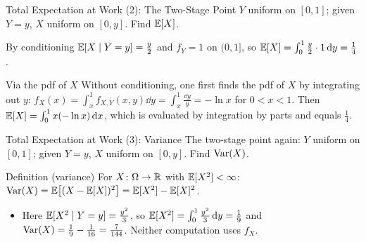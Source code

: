 \begin{frame}{Total Expectation at Work (2): The Two-Stage Point}
  \small
  $Y$ uniform on $[0,1]$; given $Y=y$, $X$ uniform on $[0,y]$. Find $\mathbb{E}[X]$.
  \begin{block}{By conditioning}
    $\mathbb{E}[X\mid Y=y]=\tfrac y2$ and $f_Y=1$ on $(0,1]$, so
    $\mathbb{E}[X]=\int_0^1\tfrac y2\cdot1\,\mathrm{d} y=\tfrac14$.
  \end{block}
  \begin{block}{Via the pdf of $X$}
    Without conditioning, one first finds the pdf of $X$ by integrating out $y$: $f_X(x)=\int_x^1 f_{X,Y}(x,y)\dd y=\int_x^1\tfrac{\dd y}{y}=-\ln x$ for $0<x<1$.
    Then $\mathbb{E}[X]=\int_0^1 x(-\ln x)\,\mathrm{d} x$, which is evaluated by integration by parts and equals $\tfrac14$.
  \end{block}
\end{frame}

\begin{frame}{Total Expectation at Work (3): Variance}
  \small
  \label{variance}%
  The two-stage point again: $Y$ uniform on $[0,1]$; given $Y=y$, $X$ uniform on $[0,y]$. Find $\operatorname{Var}(X)$.
  \begin{block}{Definition (variance)}
    For $X\colon\Omega\to\mathbb{R}$ with $\mathbb{E}[X^2]<\infty$: \quad $\operatorname{Var}(X)=\mathbb{E}\big[(X-\mathbb{E}[X])^2\big]=\mathbb{E}[X^2]-\mathbb{E}[X]^2$.
  \end{block}
  \begin{itemize}
    \item Here $\mathbb{E}[X^2\mid Y=y]=\tfrac{y^2}3$, so $\mathbb{E}[X^2]=\int_0^1\tfrac{y^2}3\,\mathrm{d} y=\tfrac19$ and $\operatorname{Var}(X)=\tfrac19-\tfrac1{16}=\tfrac7{144}$. Neither computation uses $f_X$.
  \end{itemize}
\end{frame}

